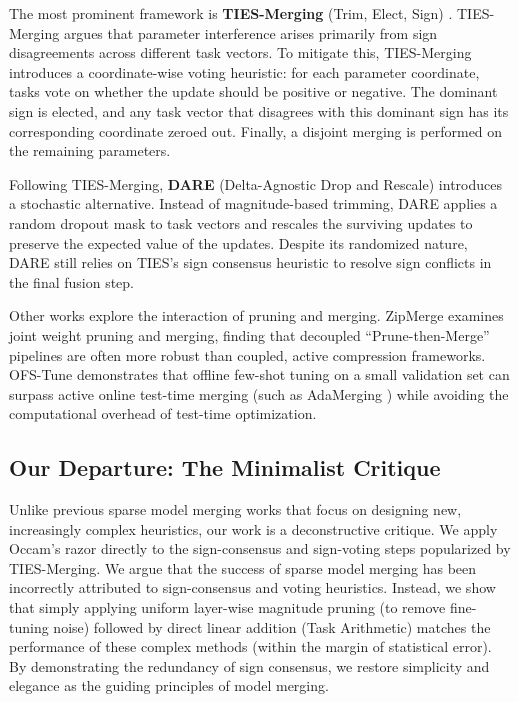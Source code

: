 The most prominent framework is \textbf{TIES-Merging} (Trim, Elect, Sign) \cite{Yadav2023}. TIES-Merging argues that parameter interference arises primarily from sign disagreements across different task vectors. To mitigate this, TIES-Merging introduces a coordinate-wise voting heuristic: for each parameter coordinate, tasks vote on whether the update should be positive or negative. The dominant sign is elected, and any task vector that disagrees with this dominant sign has its corresponding coordinate zeroed out. Finally, a disjoint merging is performed on the remaining parameters.

Following TIES-Merging, \textbf{DARE} (Delta-Agnostic Drop and Rescale) \cite{Yu24} introduces a stochastic alternative. Instead of magnitude-based trimming, DARE applies a random dropout mask to task vectors and rescales the surviving updates to preserve the expected value of the updates. Despite its randomized nature, DARE still relies on TIES's sign consensus heuristic to resolve sign conflicts in the final fusion step.

Other works explore the interaction of pruning and merging. ZipMerge \cite{ZipMerge2025} examines joint weight pruning and merging, finding that decoupled ``Prune-then-Merge'' pipelines are often more robust than coupled, active compression frameworks. OFS-Tune \cite{OFS2025} demonstrates that offline few-shot tuning on a small validation set can surpass active online test-time merging (such as AdaMerging \cite{AdaMerging2023}) while avoiding the computational overhead of test-time optimization.

\subsection{Our Departure: The Minimalist Critique}
Unlike previous sparse model merging works that focus on designing new, increasingly complex heuristics, our work is a deconstructive critique. We apply Occam's razor directly to the sign-consensus and sign-voting steps popularized by TIES-Merging. We argue that the success of sparse model merging has been incorrectly attributed to sign-consensus and voting heuristics. Instead, we show that simply applying uniform layer-wise magnitude pruning (to remove fine-tuning noise) followed by direct linear addition (Task Arithmetic) matches the performance of these complex methods (within the margin of statistical error). By demonstrating the redundancy of sign consensus, we restore simplicity and elegance as the guiding principles of model merging.
